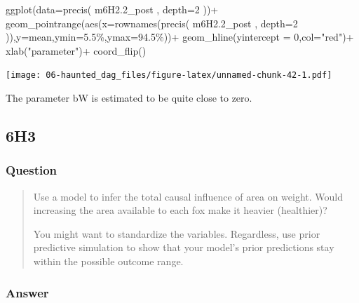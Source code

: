 \documentclass[
]{book}
\newenvironment{Shaded}{\begin{snugshade}}{\end{snugshade}}
\newcommand{\AttributeTok}[1]{\textcolor[rgb]{0.77,0.63,0.00}{#1}}
\newcommand{\DecValTok}[1]{\textcolor[rgb]{0.00,0.00,0.81}{#1}}
\newcommand{\FloatTok}[1]{\textcolor[rgb]{0.00,0.00,0.81}{#1}}
\newcommand{\FunctionTok}[1]{\textcolor[rgb]{0.00,0.00,0.00}{#1}}
\newcommand{\NormalTok}[1]{#1}
\newcommand{\SpecialCharTok}[1]{\textcolor[rgb]{0.00,0.00,0.00}{#1}}
\newcommand{\StringTok}[1]{\textcolor[rgb]{0.31,0.60,0.02}{#1}}
\begin{document}
\begin{Shaded}
\begin{Highlighting}[]
\FunctionTok{ggplot}\NormalTok{(}\AttributeTok{data=}\FunctionTok{precis}\NormalTok{( m6H2}\FloatTok{.2}\NormalTok{\_post , }\AttributeTok{depth=}\DecValTok{2}\NormalTok{ ))}\SpecialCharTok{+}
  \FunctionTok{geom\_pointrange}\NormalTok{(}\FunctionTok{aes}\NormalTok{(}\AttributeTok{x=}\FunctionTok{rownames}\NormalTok{(}\FunctionTok{precis}\NormalTok{( m6H2}\FloatTok{.2}\NormalTok{\_post , }\AttributeTok{depth=}\DecValTok{2}\NormalTok{ )),}\AttributeTok{y=}\NormalTok{mean,}\AttributeTok{ymin=}\StringTok{\textasciigrave{}}\AttributeTok{5.5\%}\StringTok{\textasciigrave{}}\NormalTok{,}\AttributeTok{ymax=}\StringTok{\textasciigrave{}}\AttributeTok{94.5\%}\StringTok{\textasciigrave{}}\NormalTok{))}\SpecialCharTok{+}
  \FunctionTok{geom\_hline}\NormalTok{(}\AttributeTok{yintercept =} \DecValTok{0}\NormalTok{,}\AttributeTok{col=}\StringTok{"red"}\NormalTok{)}\SpecialCharTok{+}
  \FunctionTok{xlab}\NormalTok{(}\StringTok{"parameter"}\NormalTok{)}\SpecialCharTok{+}
  \FunctionTok{coord\_flip}\NormalTok{()}
\end{Highlighting}
\end{Shaded}

\texttt{[image: 06-haunted\_dag\_files/figure-latex/unnamed-chunk-42-1.pdf]}

The parameter bW is estimated to be quite close to zero.

\hypertarget{h3-2}{%
\subsection*{6H3}\label{h3-2}}

\hypertarget{question-57}{%
\subsubsection*{Question}\label{question-57}}

\begin{quote}
Use a model to infer the total causal influence of area on weight. Would increasing the area available to each fox make it heavier (healthier)?

You might want to standardize the variables. Regardless, use prior predictive simulation to show that your model's prior predictions stay within the possible outcome range.
\end{quote}

\hypertarget{answer-57}{%
\subsubsection*{Answer}\label{answer-57}}
\end{document}
